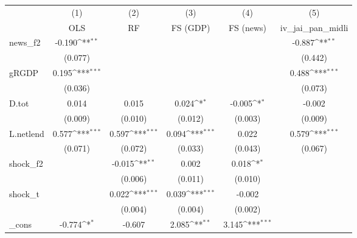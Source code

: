 {
\def\sym#1{\ifmmode^{#1}\else\(^{#1}\)\fi}
\begin{tabular}{l*{5}{c}}
\toprule
            &\multicolumn{1}{c}{(1)}&\multicolumn{1}{c}{(2)}&\multicolumn{1}{c}{(3)}&\multicolumn{1}{c}{(4)}&\multicolumn{1}{c}{(5)}\\
            &\multicolumn{1}{c}{OLS}&\multicolumn{1}{c}{RF}&\multicolumn{1}{c}{FS (GDP)}&\multicolumn{1}{c}{FS (news)}&\multicolumn{1}{c}{iv\_jai\_pan\_midli}\\
\midrule
news\_f2     &      -0.190\sym{**} &                     &                     &                     &      -0.887\sym{**} \\
            &     (0.077)         &                     &                     &                     &     (0.442)         \\
\addlinespace
gRGDP       &       0.195\sym{***}&                     &                     &                     &       0.488\sym{***}\\
            &     (0.036)         &                     &                     &                     &     (0.073)         \\
\addlinespace
D.tot       &       0.014         &       0.015         &       0.024\sym{*}  &      -0.005\sym{*}  &      -0.002         \\
            &     (0.009)         &     (0.010)         &     (0.012)         &     (0.003)         &     (0.009)         \\
\addlinespace
L.netlend   &       0.577\sym{***}&       0.597\sym{***}&       0.094\sym{***}&       0.022         &       0.579\sym{***}\\
            &     (0.071)         &     (0.072)         &     (0.033)         &     (0.043)         &     (0.067)         \\
\addlinespace
shock\_f2    &                     &      -0.015\sym{**} &       0.002         &       0.018\sym{*}  &                     \\
            &                     &     (0.006)         &     (0.011)         &     (0.010)         &                     \\
\addlinespace
shock\_t     &                     &       0.022\sym{***}&       0.039\sym{***}&      -0.002         &                     \\
            &                     &     (0.004)         &     (0.004)         &     (0.002)         &                     \\
\addlinespace
\_cons      &      -0.774\sym{*}  &      -0.607         &       2.085\sym{**} &       3.145\sym{***}&                     \\

\end{tabular}}
